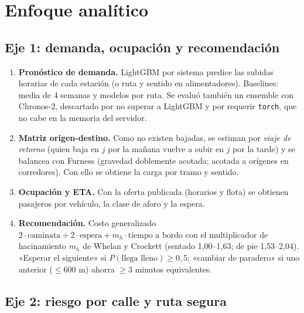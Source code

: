 \documentclass[11pt]{article}
\newcommand{\code}[1]{\texttt{#1}}
\begin{document}
\section{Enfoque analítico}

\subsection{Eje 1: demanda, ocupación y recomendación}

\begin{enumerate}
  \item \textbf{Pronóstico de demanda.} LightGBM por sistema predice las subidas horarias de cada
        estación (o ruta y sentido en alimentadores). Baselines: media de 4 semanas y modelos por
        ruta. Se evaluó también un ensemble con Chronos-2, descartado por no superar a LightGBM y
        por requerir \code{torch}, que no cabe en la memoria del servidor.
  \item \textbf{Matriz origen-destino.} Como no existen bajadas, se estiman por \emph{viaje de
        retorno} (quien baja en $j$ por la mañana vuelve a subir en $j$ por la tarde) y se balancea
        con Furness (gravedad doblemente acotada; acotada a orígenes en corredores). Con ello se
        obtiene la carga por tramo y sentido.
  \item \textbf{Ocupación y ETA.} Con la oferta publicada (horarios y flota) se obtienen pasajeros
        por vehículo, la clase de aforo y la espera.
  \item \textbf{Recomendación.} Costo generalizado
        $2\cdot\text{caminata}+2\cdot\text{espera}+m_h\cdot\text{tiempo a bordo}$ con el
        multiplicador de hacinamiento $m_h$ de Whelan y Crockett (sentado 1,00--1,63; de pie
        1,53--2,04). «Esperar el siguiente» si $P(\text{llega lleno})\ge 0{,}5$; «cambiar de
        paradero» si uno anterior ($\le 600$ m) ahorra $\ge 3$ minutos equivalentes.
\end{enumerate}

\subsection{Eje 2: riesgo por calle y ruta segura}
\end{document}
